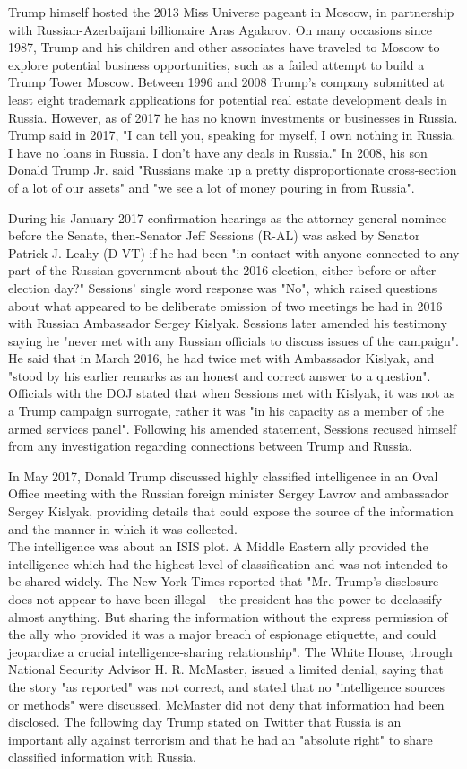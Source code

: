 Trump himself hosted the 2013 Miss Universe pageant in Moscow, in
partnership with Russian-Azerbaijani billionaire Aras Agalarov. On many
occasions since 1987, Trump and his children and other associates have
traveled to Moscow to explore potential business opportunities, such as
a failed attempt to build a Trump Tower Moscow. Between 1996 and 2008
Trump's company submitted at least eight trademark applications for
potential real estate development deals in Russia. However, as of 2017
he has no known investments or businesses in Russia. Trump said in 2017,
"I can tell you, speaking for myself, I own nothing in Russia. I have no
loans in Russia. I don't have any deals in Russia." In 2008, his son
Donald Trump Jr. said "Russians make up a pretty disproportionate
cross-section of a lot of our assets" and "we see a lot of money pouring
in from Russia".

During his January 2017 confirmation hearings as the attorney general
nominee before the Senate, then-Senator Jeff Sessions (R-AL) was asked
by Senator Patrick J. Leahy (D-VT) if he had been "in contact with
anyone connected to any part of the Russian government about the 2016
election, either before or after election day?" Sessions' single word
response was "No", which raised questions about what appeared to be
deliberate omission of two meetings he had in 2016 with Russian
Ambassador Sergey Kislyak. Sessions later amended his testimony saying
he "never met with any Russian officials to discuss issues of the
campaign". He said that in March 2016, he had twice met with Ambassador
Kislyak, and "stood by his earlier remarks as an honest and correct
answer to a question". Officials with the DOJ stated that when Sessions
met with Kislyak, it was not as a Trump campaign surrogate, rather it
was "in his capacity as a member of the armed services panel". Following
his amended statement, Sessions recused himself from any investigation
regarding connections between Trump and Russia.

In May 2017, Donald Trump discussed highly classified intelligence in an
Oval Office meeting with the Russian foreign minister Sergey Lavrov and
ambassador Sergey Kislyak, providing details that could expose the
source of the information and the manner in which it was collected.\\
The intelligence was about an ISIS plot. A Middle Eastern ally provided
the intelligence which had the highest level of classification and was
not intended to be shared widely. The New York Times reported that "Mr.
Trump's disclosure does not appear to have been illegal - the president
has the power to declassify almost anything. But sharing the information
without the express permission of the ally who provided it was a major
breach of espionage etiquette, and could jeopardize a crucial
intelligence-sharing relationship". The White House, through National
Security Advisor H. R. McMaster, issued a limited denial, saying that
the story "as reported" was not correct, and stated that no
"intelligence sources or methods" were discussed. McMaster did not deny
that information had been disclosed. The following day Trump stated on
Twitter that Russia is an important ally against terrorism and that he
had an "absolute right" to share classified information with Russia.

